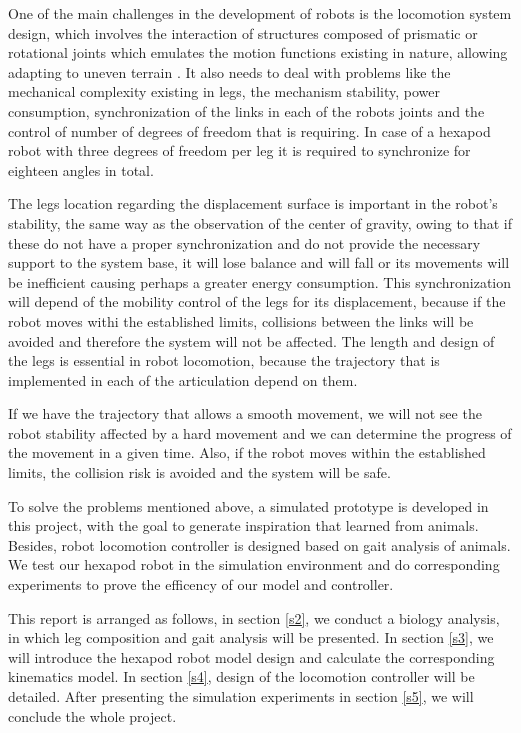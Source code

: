 \documentclass[conference]{IEEEtran}
\begin{document}
One of the main challenges in the development of robots is the locomotion system design, which involves the interaction of structures composed of prismatic or rotational joints which emulates the motion functions existing in nature, allowing adapting to uneven terrain \cite{a15}. It also needs to deal with problems like the mechanical complexity existing in legs, the mechanism stability, power consumption, synchronization of the links in each of the robots joints and the control of number of degrees of freedom that is requiring.\cite{aa} In case of a hexapod robot with three degrees of freedom per leg it is required to synchronize for eighteen angles in total.

The legs location regarding the displacement surface is important in the robot’s stability, the same way as the observation of the center of gravity, owing to that if these do not have a proper synchronization and do not provide the necessary support to the system base, it will lose balance and will fall or its movements will be inefficient causing perhaps a greater energy consumption\cite{a16}. This synchronization will depend of the mobility control of the legs for its displacement, because if the robot moves withi the established limits, collisions between the links will be avoided and therefore the system will not be affected. The length and design of the legs is essential in robot locomotion, because the trajectory that is implemented in each of the articulation depend on them.

If we have the trajectory that allows a smooth movement, we will not see the robot stability affected by a hard movement and we can determine the progress of the movement in a given time. Also, if the robot moves within the established limits, the collision risk is avoided and the system will be safe.

To solve the problems mentioned above, a simulated prototype is developed in this project, with the goal to generate inspiration that learned from animals. Besides, robot locomotion controller is designed based on gait analysis of animals. We test our hexapod robot in the simulation environment and do corresponding experiments to prove the efficency of our model and controller. 

This report is arranged as follows, in section \ref{s2}, we conduct a biology analysis, in which leg composition and gait analysis will be presented. In section \ref{s3}, we will introduce the hexapod robot model design and calculate the corresponding kinematics model. In section \ref{s4}, design of the locomotion controller will be detailed. After presenting the simulation experiments in section \ref{s5}, we will conclude the whole project.
\end{document}
